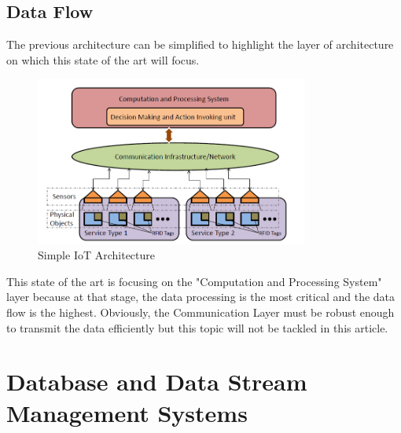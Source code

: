\documentclass[11pt]{article}
\begin{document}
\subsection{Data Flow}

The previous architecture can be simplified to highlight the layer of architecture on which this state of the art will focus.
\newline
\begin{figure}[h]
	\includegraphics[width=0.8\textwidth]{assets/Basic_IOT_Architecture.png} 
	\caption{Simple IoT Architecture}
	\label{fig:simpleArchitecture}
\end{figure}

This state of the art is focusing on the "Computation and Processing System" layer because at that stage, the data processing is the most critical and the data flow is the highest. Obviously, the Communication Layer must be robust enough to transmit the data efficiently but this topic will not be tackled in this article.

\section{Database and Data Stream Management Systems}
\end{document}
